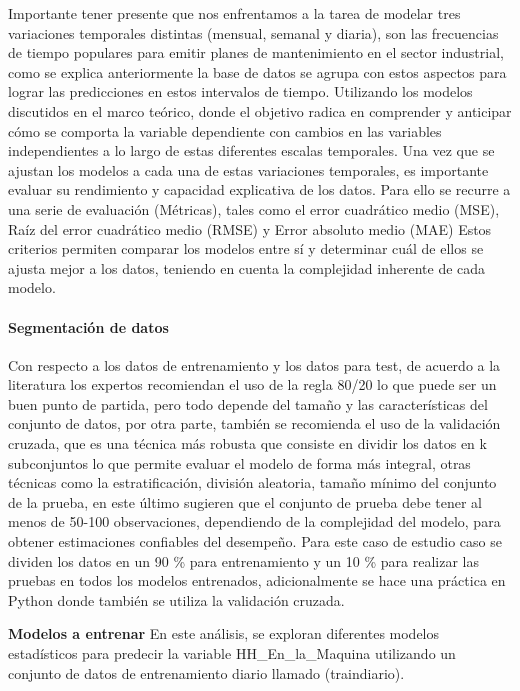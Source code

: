 \documentclass[
  11pt,
  bookmarksnumbered]{article}
\begin{document}
Importante tener presente que nos enfrentamos a la tarea de modelar tres variaciones temporales distintas (mensual, semanal y diaria), son las frecuencias de tiempo populares para emitir planes de mantenimiento en el sector industrial, como se explica anteriormente la base de datos se agrupa con estos aspectos para lograr las predicciones en estos intervalos de tiempo.
Utilizando los modelos discutidos en el marco teórico, donde el objetivo radica en comprender y anticipar cómo se comporta la variable dependiente con cambios en las variables independientes a lo largo de estas diferentes escalas temporales.
Una vez que se ajustan los modelos a cada una de estas variaciones temporales, es importante evaluar su rendimiento y capacidad explicativa de los datos.
Para ello se recurre a una serie de evaluación (Métricas), tales como el error cuadrático medio (MSE), Raíz del error cuadrático medio (RMSE) y Error absoluto medio (MAE) Estos criterios permiten comparar los modelos entre sí y determinar cuál de ellos se ajusta mejor a los datos, teniendo en cuenta la complejidad inherente de cada modelo.

\hypertarget{segmentaciuxf3n-de-datos}{%
\paragraph{Segmentación de datos}\label{segmentaciuxf3n-de-datos}}

Con respecto a los datos de entrenamiento y los datos para test, de acuerdo a la literatura los expertos recomiendan el uso de la regla 80/20 lo que puede ser un buen punto de partida, pero todo depende del tamaño y las características del conjunto de datos, por otra parte, también se recomienda el uso de la validación cruzada, que es una técnica más robusta que consiste en dividir los datos en k subconjuntos lo que permite evaluar el modelo de forma más integral, otras técnicas como la estratificación, división aleatoria, tamaño mínimo del conjunto de la prueba, en este último sugieren que el conjunto de prueba debe tener al menos de 50-100 observaciones, dependiendo de la complejidad del modelo, para obtener estimaciones confiables del desempeño.
Para este caso de estudio caso se dividen los datos en un 90 \% para entrenamiento y un 10 \% para realizar las pruebas en todos los modelos entrenados, adicionalmente se hace una práctica en Python donde también se utiliza la validación cruzada.

\textbf{Modelos a entrenar} En este análisis, se exploran diferentes modelos estadísticos para predecir la variable HH\_En\_la\_Maquina utilizando un conjunto de datos de entrenamiento diario llamado (traindiario).
\end{document}
